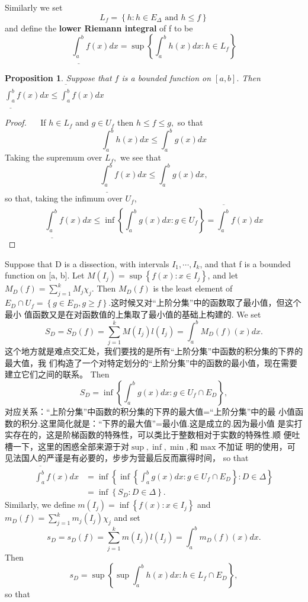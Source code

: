 \documentclass[12pt]{book}
\theoremstyle{definition}\newtheorem{dfn}{Définition}[chapter]
\theoremstyle{plain}\newtheorem{thm}{Théorème}[chapter]
\theoremstyle{plain}\newtheorem{prp}{Proposition}[chapter]
\theoremstyle{plain}\newtheorem{lem}{\bf Lemme}[chapter]
\theoremstyle{plain}\newtheorem{axm}{\bf Axiome}[chapter]
\theoremstyle{plain}\newtheorem{lmm}{\bf Lemme}[chapter]
\theoremstyle{plain}\newtheorem{cor}{\bf Corollaire}[chapter]
\theoremstyle{remark}\newtheorem{rem}{Remarque}[chapter]
\begin{document}
Similarly we set
$$L_f = \left\{h : h \in E_{\Delta}\text{ and }h \le f\right\}$$
and define the {\bf lower Riemann integral} of f to be
$$
\underline{\int^b_a}f(x)d x=\sup\left\{\int^b_a h(x) dx : h \in L_f\right\}
$$
\begin{prp}
Suppose that $f$ is a bounded function on $[a, b] .$ Then $\underline{\int_{a}^{b}} f(x) d x \leq \overline{\int_{a}^{b}} f(x) d x$
\end{prp}
\begin{proof}
$\quad$ If $h \in L_{f}$ and $g \in U_{f}$ then $h \leq f \leq g,$ so that
$$
\int_{a}^{b} h(x) d x \leq \int_{a}^{b} g(x) d x
$$
Taking the supremum over $L_{f},$ we see that
$$
\underline{\int_{a}^{b}} f(x) d x \leq \int_{a}^{b} g(x) d x,
$$
so that, taking the infimum over $U_{f}$,
$$
\underline{\int_{a}^{b}} f(x) d x \leq \inf \left\{\int_{a}^{b} g(x) d x: g \in U_{f}\right\}=\overline{\int_{a}^{b}} f(x) d x
$$
\end{proof}
Suppose that D is a dissection, with intervals $I_1, \cdots , I_k$, and that f is
a bounded function on [a, b]. Let $M(I_j) =\sup\left\{f(x) : x \in I_j\right\}$, and let
$M_D(f) = \sum^k_{j=1} M_j\chi_j$. Then $M_D(f)$ is the least element of $E_D \cap U_f =\left\{g \in
E_D, g \ge f\right\}$.这时候又对“上阶分集”中的函数取了最小值，但这个最小
值函数又是在对函数值的上集取了最小值的基础上构建的. We set
$$S_D = S_D(f) =\sum^k_{j=1}M(I_j)l(I_j) =\int^b_aM_D(f)(x) d x.$$
这个地方就是难点交汇处，我们要找的是所有“上阶分集”中函数的积分集的下界的最大值，我
们构造了一个对特定划分的“上阶分集”中的函数的最小值，现在需要建立它们之间的联系。
Then $$S_D = \inf\left\{\int^b_a g(x) dx : g \in U_f \cap E_D\right\},$$
对应关系：“上阶分集”中函数的积分集的下界的最大值=“上阶分集”中的最
小值函数的积分.这里简化就是：“下界的最大值”=最小值.这是成立的.因为最小值
是实打实存在的，这是阶梯函数的特殊性，可以类比于整数相对于实数的特殊性.顺
便吐槽一下，这里的困惑全部来源于对$\sup,$$\inf,$$\min,$和$\max$不加证
明的使用，可见法国人的严谨是有必要的，步步为营最后反而赢得时间，
so that
$$\begin{aligned}
\overline{\int^b_a}f(x) dx &=\inf\left\{\inf\left\{
\int^b_ag(x) dx : g \in U_f \cap E_D\right\} : D \in \Delta\right\}\\
&=\inf\left\{S_D : D \in \Delta\right\}.
\end{aligned}$$
Similarly, we define $m(I_j) =\inf\left\{f(x) : x \in I_j\right\}$ and
$m_D(f) = \sum^k_{j=1} m_j(I_j)\chi_j$
and set $$s_D = s_D(f) =\sum^k_{j=1}m(I_j)l(I_j) =\int^b_am_D(f)(x) d x.$$
Then $$s_D = \sup\left\{\sup\int^b_a h(x) dx : h \in L_f \cap E_D\right\},$$ so that
\end{document}
